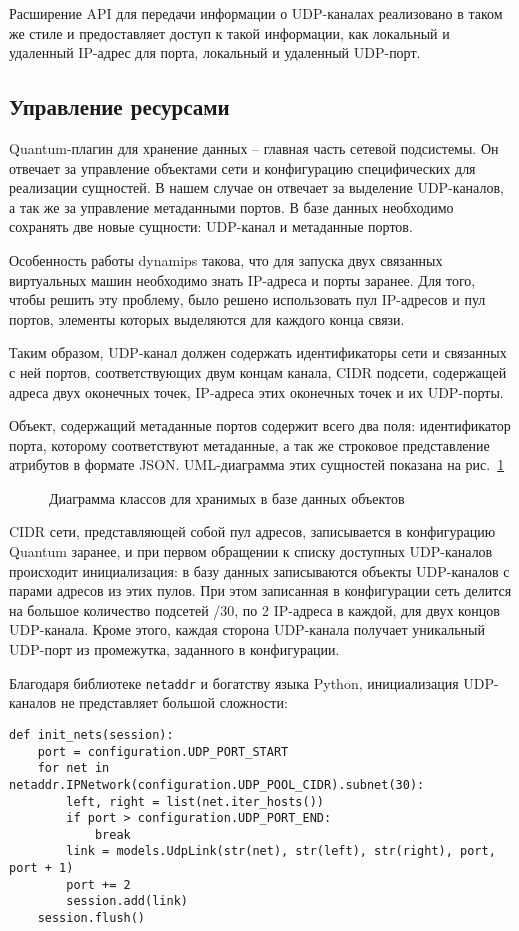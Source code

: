 Расширение API для передачи информации о UDP-каналах реализовано в таком же стиле
и предоставляет доступ к такой информации, как локальный и удаленный IP-адрес для порта,
локальный и удаленный UDP-порт.

\subsection{Управление ресурсами}

Quantum-плагин для хранение данных -- главная часть сетевой подсистемы. Он отвечает 
за управление объектами сети и конфигурацию специфических для реализации сущностей.
В нашем случае он отвечает за выделение UDP-каналов, а так же за управление метаданными портов. 
В базе данных необходимо сохранять две новые сущности: UDP-канал и метаданные портов. 

Особенность работы dynamips такова, что для запуска двух связанных виртуальных машин 
необходимо знать IP-адреса и порты заранее. Для того, чтобы решить эту проблему,
было решено использовать пул IP-адресов и пул портов, элементы которых 
выделяются для каждого конца связи.

Таким образом, UDP-канал должен содержать идентификаторы сети и связанных с ней портов, 
соответствующих двум концам канала, CIDR подсети, содержащей адреса двух
оконечных точек, IP-адреса этих оконечных точек и их UDP-порты.

Объект, содержащий метаданные портов содержит всего два поля: идентификатор порта,
которому соответствуют метаданные, а так же строковое представление атрибутов в формате
JSON. UML-диаграмма этих сущностей показана на рис.~\ref{fig:quantum-models-uml}
\begin{figure}
  \centering
  {\footnotesize}
  \caption{Диаграмма классов для хранимых в базе данных объектов}  
  \label{fig:quantum-models-uml}
\end{figure}

CIDR сети, представляющей собой пул адресов, 
записывается в конфигурацию Quantum заранее, и при первом обращении к списку доступных
UDP-каналов происходит инициализация: в базу данных записываются объекты UDP-каналов 
с парами адресов из этих пулов. 
При этом записанная в конфигурации сеть делится на большое количество подсетей /30, 
по 2 IP-адреса в каждой, для двух концов UDP-канала. Кроме этого, каждая сторона UDP-канала
получает уникальный UDP-порт из промежутка, заданного в конфигурации.

Благодаря библиотеке \verb`netaddr` и богатству языка Python, инициализация
UDP-каналов не представляет большой сложности:
\begin{lstlisting}
def init_nets(session):
    port = configuration.UDP_PORT_START
    for net in netaddr.IPNetwork(configuration.UDP_POOL_CIDR).subnet(30):
        left, right = list(net.iter_hosts())
        if port > configuration.UDP_PORT_END:
            break
        link = models.UdpLink(str(net), str(left), str(right), port, port + 1)
        port += 2
        session.add(link)
    session.flush()
\end{lstlisting}

